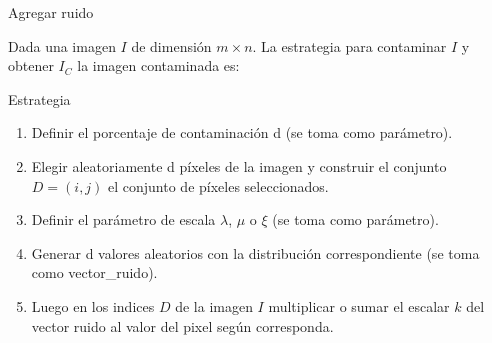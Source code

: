 \documentclass{beamer}
\begin{document}
\begin{frame}[fragile]{Agregar ruido}
	\justifying
	
	Dada una imagen $I$ de dimensión $m \times n$. La estrategia para contaminar $I$ y obtener $I_C$ la imagen contaminada es:
	
	\begin{block}{Estrategia}
		\begin{enumerate}
			\item Definir el porcentaje de contaminación d (se toma como parámetro).
			\item Elegir aleatoriamente d píxeles de la imagen y construir el conjunto $D = (i,j)$ el conjunto de píxeles seleccionados.
			\item Definir el parámetro de escala $\lambda$, $\mu$ o $\xi$ (se toma como parámetro).
			\item Generar d valores aleatorios con la distribución correspondiente (se toma como vector\_ruido).
			\item Luego en los indices $D$ de la imagen $I$ multiplicar o sumar el escalar  $k$ del vector ruido al valor del pixel según corresponda.
		\end{enumerate}
	\end{block}
\end{frame}
\end{document}
